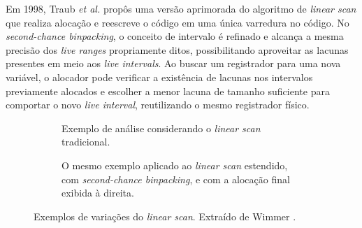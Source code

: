 \documentclass[
	12pt,				%
	openright,			%
	oneside,			%
	a4paper,			%
	tccpreliminar,			%
	]{ABNT-DC-UEL}
\begin{document}
Em 1998, Traub \textit{et al.} \cite{traub:98} propôs uma versão aprimorada do algoritmo de \textit{linear scan} que realiza alocação e reescreve o código em uma única varredura no código. No \textit{second-chance binpacking}, o conceito de intervalo é refinado e alcança a mesma precisão dos \textit{live ranges} propriamente ditos, possibilitando aproveitar as lacunas presentes em meio aos \textit{live intervals}. Ao buscar um registrador para uma nova variável, o alocador pode verificar a existência de lacunas nos intervalos previamente alocados e escolher a menor lacuna de tamanho suficiente para comportar o novo \textit{live interval}, reutilizando o mesmo registrador físico.

\begin{figure}
    \centering
    \begin{subfigure}{0.5\textwidth}
        \centering
        
        \caption{Exemplo de análise considerando o \textit{linear scan} tradicional.}
    \end{subfigure}
    
    \begin{subfigure}{0.5\textwidth}
        \centering
        
        \caption{O mesmo exemplo aplicado ao \textit{linear scan} estendido, com \textit{second-chance binpacking}, e com a alocação final exibida à direita.}
    \end{subfigure}
    \caption{Exemplos de variações do \textit{linear scan}. Extraído de Wimmer \cite{wimmer:04}.}
\end{figure}
\end{document}

